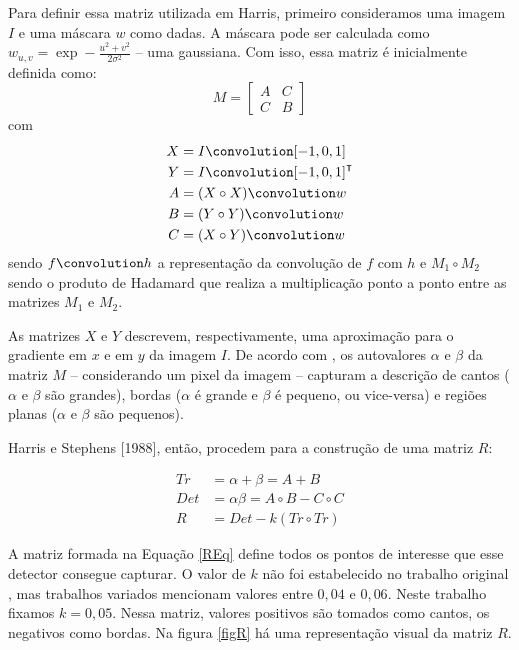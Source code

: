 \documentclass[12pt]{article}
\begin{document}
Para definir essa matriz utilizada em Harris, primeiro consideramos uma
imagem $I$ e uma máscara $w$  como dadas. A máscara pode ser calculada
como   $w_{u,v}  =   \exp   -\frac{u^2  +   v^2}{2\sigma^2}$  --   uma
gaussiana. Com isso, essa matriz é inicialmente definida como:
\[
M = \begin{bmatrix}
  A & C \\
  C & B
\end{bmatrix}
\]
com
\begin{align*}
  X & = I \convolution [-1, 0, 1] \\
  Y & = I \convolution [-1, 0, 1]^\intercal \\
  A & = (X \circ X) \convolution w \\
  B & = (Y \circ Y) \convolution w \\
  C & = (X \circ Y) \convolution w
\end{align*}
sendo $f \convolution h$ a  representação da convolução de $f$ com $h$
e  $M_1  \circ  M_2$  sendo  o  produto  de  Hadamard  que  realiza  a
multiplicação ponto a ponto entre as matrizes $M_1$ e $M_2$.

As matrizes $X$ e $Y$ descrevem, respectivamente, uma aproximação para
o  gradiente  em  $x$  e  em   $y$  da  imagem  $I$.   De  acordo  com
\cite{harris},  os autovalores  $\alpha$ e  $\beta$ da  matriz  $M$ --
considerando  um pixel  da imagem  -- capturam  a descrição  de cantos
($\alpha$ e $\beta$ são grandes),  bordas ($\alpha$ é grande e $\beta$
é pequeno,  ou vice-versa)  e regiões planas  ($\alpha$ e  $\beta$ são
pequenos).

Harris e  Stephens [1988],  então, procedem para  a construção  de uma
matriz $R$:  %

\begin{align}
  Tr & = \alpha + \beta = A + B \nonumber \\
  Det & = \alpha \beta = A \circ B - C \circ C \nonumber \\
  R & = Det - k (Tr \circ Tr) \label{REq}
\end{align}

A  matriz formada  na  Equação  \ref{REq} define  todos  os pontos  de
interesse que esse detector consegue  capturar. O valor de $k$ não foi
estabelecido  no   trabalho  original  \cite{harris},   mas  trabalhos
variados \cite{detectors, statharris} mencionam valores entre $0,04$ e
$0,06$.   Neste trabalho fixamos  $k =  0,05$.  Nessa  matriz, valores
positivos são tomados como cantos, os negativos como bordas. Na figura
\ref{figR} há uma representação visual da matriz $R$.
\end{document}
